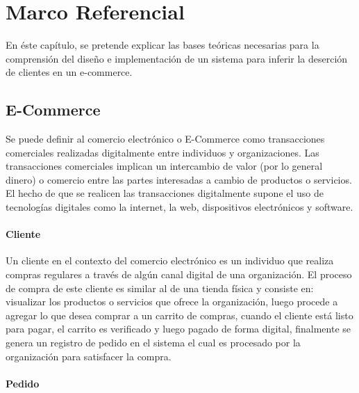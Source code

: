 
\chapter{Marco Referencial}

En éste capítulo, se pretende explicar las bases teóricas necesarias para la comprensión del diseño e implementación de un sistema para inferir la deserción de clientes en un e-commerce.

\section{E-Commerce}

Se puede definir al comercio electrónico o E-Commerce como transacciones comerciales realizadas digitalmente entre individuos y organizaciones. Las transacciones comerciales implican un intercambio de valor (por lo general dinero) o comercio entre las partes interesadas a cambio de productos o servicios. El hecho de que se realicen las transacciones digitalmente supone el uso de tecnologías digitales como la internet, la web, dispositivos electrónicos y software.

\subsubsection{Cliente}

Un cliente en el contexto del comercio electrónico es un individuo que realiza compras regulares a través de algún canal digital de una organización. El proceso de compra de este cliente es similar al de una tienda física y consiste en: visualizar los productos o servicios que ofrece la organización, luego procede a agregar lo que desea comprar a un carrito de compras, cuando el cliente está listo para pagar, el carrito es verificado y luego pagado de forma digital, finalmente se genera un registro de pedido en el sistema el cual es procesado por la organización para satisfacer la compra.

\subsubsection{Pedido}

